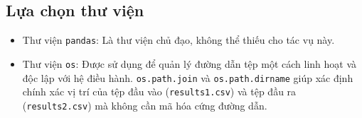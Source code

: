 \documentclass[12pt, a4paper]{report}
\begin{document}
\subsection{Lựa chọn thư viện}
\begin{itemize}[leftmargin=0em]
\renewcommand{\labelitemi}{}
    \item Thư viện \texttt{pandas}: Là thư viện chủ đạo, không thể thiếu cho tác vụ này.
    \item Thư viện \texttt{os}: Được sử dụng để quản lý đường dẫn tệp một cách linh hoạt và độc lập với hệ điều hành. \texttt{os.path.join} và \texttt{os.path.dirname} giúp xác định chính xác vị trí của tệp đầu vào (\texttt{results1.csv}) và tệp đầu ra (\texttt{results2.csv}) mà không cần mã hóa cứng đường dẫn.
\end{itemize}
\end{document}
